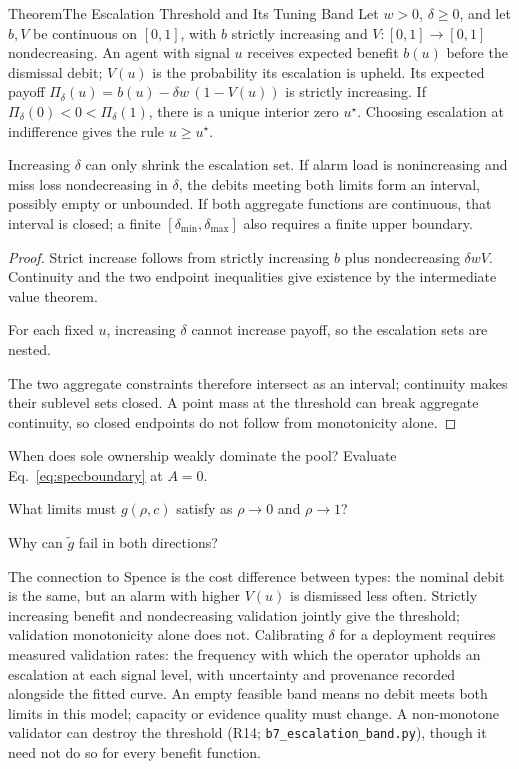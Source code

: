 \documentclass[11pt,a4paper]{article}
\theoremstyle{definition}
\theoremstyle{plain}
\begin{document}
\begin{pdclaim}{Theorem}{The Escalation Threshold and Its Tuning Band}
\setlength{\parskip}{4pt plus 1pt}
\label{thm:escalation-threshold}
Let $w>0$, $\delta\ge0$, and let $b,V$ be continuous on $[0,1]$, with $b$
strictly increasing and $V:[0,1]\to[0,1]$ nondecreasing. An agent with signal
$u$ receives expected benefit $b(u)$ before the dismissal debit; $V(u)$ is the
probability its escalation is upheld. Its expected payoff
$\Pi_\delta(u)=b(u)-\delta w\,(1-V(u))$ is strictly increasing. If
$\Pi_\delta(0)<0<\Pi_\delta(1)$, there is a unique interior zero $u^\star$.
Choosing escalation at indifference gives the rule $u\ge u^\star$.

Increasing $\delta$ can only shrink the escalation set. If alarm load is
nonincreasing and miss loss nondecreasing in $\delta$, the debits meeting both
limits form an interval, possibly empty or unbounded. If both aggregate
functions are continuous, that interval is closed; a finite
$[\delta_{\min},\delta_{\max}]$ also requires a finite upper boundary.
\end{pdclaim}
\begin{proof}
\setlength{\parskip}{4pt plus 1pt}
Strict increase follows from strictly increasing $b$ plus nondecreasing
$\delta wV$. Continuity and the two endpoint inequalities give existence by
the intermediate value theorem.

For each fixed $u$, increasing $\delta$
cannot increase payoff, so the escalation sets are nested.

The two aggregate
constraints therefore intersect as an interval; continuity makes their
sublevel sets closed. A point mass at the threshold can break aggregate
continuity, so closed endpoints do not follow from monotonicity alone.
\end{proof}
\pdexercisepointer*{\ref{ex:ls-adversarial-review-corollary}}{\ref{ex:ls-b7-escalation-run}}{\pageref{ex:ls-adversarial-review-corollary}}

\begin{pdrecitation}
\item When does sole ownership weakly dominate the pool? Evaluate Eq.~\ref{eq:specboundary} at $A=0$.
\item What limits must $g(\rho,c)$ satisfy as $\rho\to0$ and $\rho\to1$?
\item Why can $\tilde g$ fail in both directions?
\end{pdrecitation}

The connection to Spence is the cost difference between types: the nominal
debit is the same, but an alarm with higher $V(u)$ is dismissed less often.
Strictly increasing benefit and nondecreasing validation jointly give the
threshold; validation monotonicity alone does not. Calibrating $\delta$ for a
deployment requires measured validation rates: the frequency with which the
operator upholds an escalation at each signal level, with uncertainty and
provenance recorded alongside the fitted curve.
An empty feasible band means no debit meets both limits in this model; capacity
or evidence quality must change. A non-monotone validator can destroy the
threshold (R14; \texttt{b7\_escalation\_band.py}), though it need not do so for
every benefit function.
\end{document}
